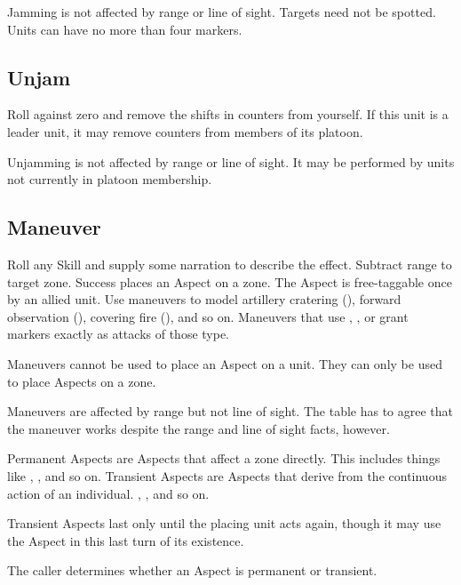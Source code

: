 Jamming is not affected by range or line of sight. Targets need not be spotted. Units can have no more than four \OOC{} markers.

\subsection{Unjam}\label{sec:platoon-combat-unjam} %

Roll  against zero and remove the shifts in \OOC{} counters from yourself. If this unit is a leader unit, it may remove \OOC{} counters from members of its platoon.

Unjamming is not affected by range or line of sight. It may be performed by units not currently in platoon membership.

\subsection{Maneuver}\label{sec:platoon-combat-maneuver}

Roll any Skill and supply some narration to describe the effect. Subtract range to target zone. Success places an Aspect on a zone. The Aspect is free-taggable once by an allied unit. Use maneuvers to model artillery cratering (), forward observation (), covering fire (), and so on. Maneuvers that use , , or  grant \SPOTTED{} markers exactly as attacks of those type.

Maneuvers cannot be used to place an Aspect on a unit. They can only be used to place Aspects on a zone.

Maneuvers are affected by range but not line of sight. The table has to agree that the maneuver works despite the range and line of sight facts, however.

Permanent Aspects are Aspects that affect a zone directly. This includes things like , , and so on. Transient Aspects are Aspects that derive from the continuous action of an individual. , , and so on.

Transient Aspects last only until the placing unit acts again, though it may use the Aspect in this last turn of its existence.

The caller determines whether an Aspect is permanent or transient.



